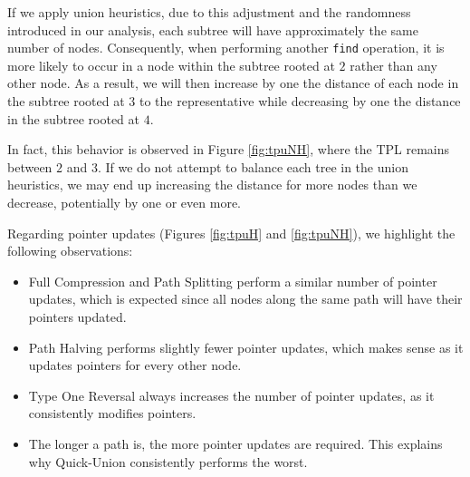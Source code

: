 If we apply union heuristics, due to this adjustment and the randomness introduced in our analysis, each subtree will have approximately the same number of nodes. Consequently, when performing another \texttt{find} operation, it is more likely to occur in a node within the subtree rooted at $2$ rather than any other node. As a result, we will then increase by one the distance of each node in the subtree rooted at $3$ to the representative while decreasing by one the distance in the subtree rooted at $4$. 

In fact, this behavior is observed in Figure \ref{fig:tpuNH}, where the TPL remains between $2$ and $3$. If we do not attempt to balance each tree in the union heuristics, we may end up increasing the distance for more nodes than we decrease, potentially by one or even more.

Regarding pointer updates (Figures \ref{fig:tpuH} and \ref{fig:tpuNH}), we highlight the following observations:

\begin{itemize}
    \item Full Compression and Path Splitting perform a similar number of pointer updates, which is expected since all nodes along the same path will have their pointers updated.
    \item Path Halving performs slightly fewer pointer updates, which makes sense as it updates pointers for every other node.
    \item Type One Reversal always increases the number of pointer updates, as it consistently modifies pointers.
    \item The longer a path is, the more pointer updates are required. This explains why Quick-Union consistently performs the worst.
\end{itemize}






